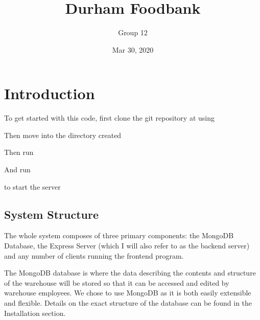 \documentclass[letterpaper,10pt,english]{sphinxmanual}
\title{Durham Foodbank}
\date{Mar 30, 2020}
\author{Group 12}
\begin{document}
\pagestyle{empty}
\sphinxmaketitle
\pagestyle{plain}
\sphinxtableofcontents
\pagestyle{normal}
\label{\detokenize{index::doc}}



\chapter{Introduction}
\label{\detokenize{index:introduction}}
To get started with this code, first clone the git repository at
 using

\begin{sphinxVerbatim}[commandchars=\\\{\}]
  
\end{sphinxVerbatim}

Then move into the directory created

Then run

\begin{sphinxVerbatim}[commandchars=\\\{\}]
 
\end{sphinxVerbatim}

And run

\begin{sphinxVerbatim}[commandchars=\\\{\}]
 
\end{sphinxVerbatim}

to start the server


\section{System Structure}
\label{\detokenize{docs/Introduction/Backend_overview:system-structure}}\label{\detokenize{docs/Introduction/Backend_overview::doc}}
The whole system composes of three primary components: the MongoDB
Database, the Express Server (which I will also refer to as the back\sphinxhyphen{}end
server) and any number of clients running the front\sphinxhyphen{}end program.

The MongoDB database is where the data describing the contents and
structure of the warehouse will be stored so that it can be accessed and
edited by warehouse employees. We chose to use MongoDB as it is both
easily extensible and flexible. Details on the exact structure of the
database can be found in the Installation section.
\end{document}
